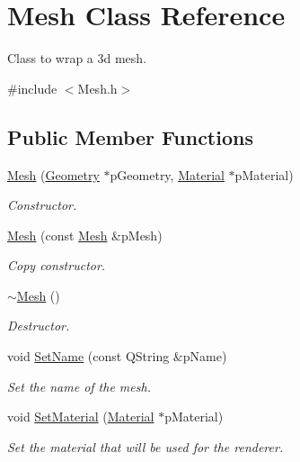 \hypertarget{class_mesh}{\section{Mesh Class Reference}
\label{class_mesh}
}


Class to wrap a 3d mesh.  




{\ttfamily \#include $<$Mesh.\+h$>$}

\subsection*{Public Member Functions}
\begin{DoxyCompactItemize}
\item 
\hyperlink{class_mesh_a991359ff0207d53b98914d6fd100ddad}{Mesh} (\hyperlink{class_geometry}{Geometry} $\ast$p\+Geometry, \hyperlink{class_material}{Material} $\ast$p\+Material)
\begin{DoxyCompactList}\small\item\em Constructor. \end{DoxyCompactList}\item 
\hyperlink{class_mesh_a74e6d62bf48be93eb6e60dd841e2c0fb}{Mesh} (const \hyperlink{class_mesh}{Mesh} \&p\+Mesh)
\begin{DoxyCompactList}\small\item\em Copy constructor. \end{DoxyCompactList}\item 
\hyperlink{class_mesh_a5efe4da1a4c0971cfb037bd70304c303}{$\sim$\+Mesh} ()
\begin{DoxyCompactList}\small\item\em Destructor. \end{DoxyCompactList}\item 
void \hyperlink{class_mesh_a4e559d8d1885c5011012e23380164929}{Set\+Name} (const Q\+String \&p\+Name)
\begin{DoxyCompactList}\small\item\em Set the name of the mesh. \end{DoxyCompactList}\item 
void \hyperlink{class_mesh_a5b2bd1a8d85e191f0c3be366ff020bd4}{Set\+Material} (\hyperlink{class_material}{Material} $\ast$p\+Material)
\begin{DoxyCompactList}\small\item\em Set the material that will be used for the renderer. \end{DoxyCompactList}\item 

\end{DoxyCompactItemize}

